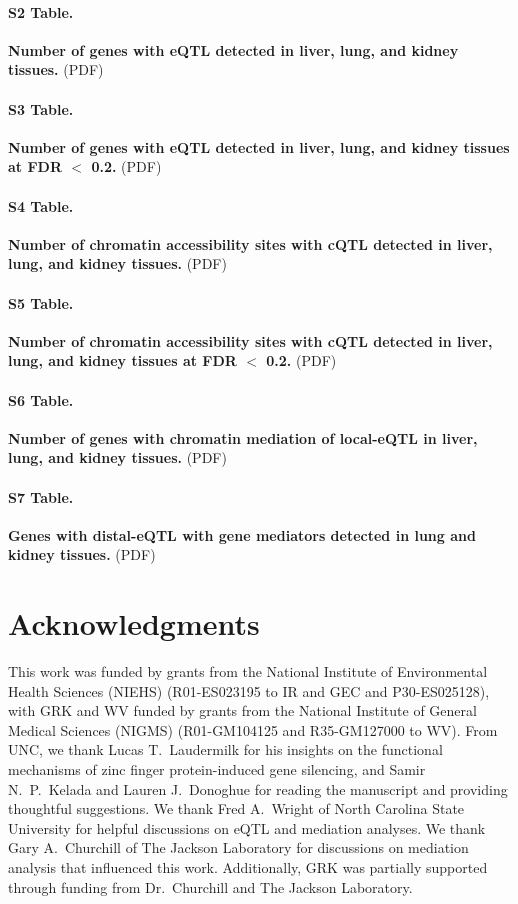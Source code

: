\documentclass[10pt,letterpaper]{article}
\begin{document}
\paragraph*{S2 Table.}
\label{S_eqtl}
{\bf Number of genes with eQTL detected in liver, lung, and kidney tissues.} 
(PDF)

\paragraph*{S3 Table.}
\label{S_eqtl_lenient}
{\bf Number of genes with eQTL detected in liver, lung, and kidney tissues at FDR $<$ 0.2.} 
(PDF)

\paragraph*{S4 Table.}
\label{S_cqtl}
{\bf Number of chromatin accessibility sites with cQTL detected in liver, lung, and kidney tissues.} 
(PDF)

\paragraph*{S5 Table.}
\label{S_cqtl_lenient}
{\bf Number of chromatin accessibility sites with cQTL detected in liver, lung, and kidney tissues at FDR $<$ 0.2.} 
(PDF)

\paragraph*{S6 Table.}
\label{S_mediation}
{\bf Number of genes with chromatin mediation of local-eQTL in liver, lung, and kidney tissues.} 
(PDF)

\paragraph*{S7 Table.}
\label{S_exmediation}
{\bf Genes with distal-eQTL with gene mediators detected in lung and kidney tissues.} 
(PDF)


\section*{Acknowledgments}
This work was funded by grants from the National Institute of Environmental Health Sciences (NIEHS) (R01-ES023195 to IR and GEC and P30-ES025128), with GRK and WV funded by grants from the National Institute of General Medical Sciences (NIGMS) (R01-GM104125 and R35-GM127000 to WV). From UNC, we thank Lucas T.\ Laudermilk for his insights on the functional mechanisms of zinc finger protein-induced gene silencing, and Samir N.\ P.\ Kelada and Lauren J.\ Donoghue for reading the manuscript and providing thoughtful suggestions. We thank Fred A.\ Wright of North Carolina State University for helpful discussions on eQTL and mediation analyses. We thank Gary A.\ Churchill of The Jackson Laboratory for discussions on mediation analysis that influenced this work. Additionally, GRK was partially supported through funding from Dr.\ Churchill and The Jackson Laboratory.
\end{document}
